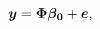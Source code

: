\begin{equation}
\label{eq:Model_Noisy}
\boldsymbol{y}=\boldsymbol{\Phi} \boldsymbol{\beta_0} + \boldsymbol{e} ,
\end{equation}
